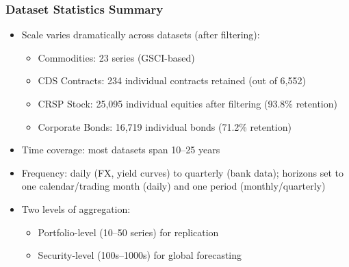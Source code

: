 \documentclass[ignorenonframetext, 9pt]{beamer}
\begin{document}
\begin{frame}
  \frametitle{Dataset Statistics Summary}
  \label{slide:dataset_stats}
\small
\begin{itemize}
\item \alert{Scale varies dramatically across datasets (after filtering):}
\begin{itemize}
  \item Commodities: 23 series (GSCI-based)
  \item CDS Contracts: 234 individual contracts retained (out of 6,552)
  \item CRSP Stock: 25,095 individual equities after filtering (93.8\% retention)
  \item Corporate Bonds: 16,719 individual bonds (71.2\% retention)
\end{itemize}
\vspace{0.3cm}
\item \alert{Time coverage:} most datasets span 10--25 years
\vspace{0.3cm}
\item \alert{Frequency:} daily (FX, yield curves) to quarterly (bank data); horizons set to one calendar/trading month (daily) and one period (monthly/quarterly)
\vspace{0.3cm}
\item \alert{Two levels of aggregation:}
\begin{itemize}
  \item Portfolio-level (10--50 series) for replication
  \item Security-level (100s--1000s) for global forecasting
\end{itemize}
\end{itemize}
\end{frame}
\end{document}
